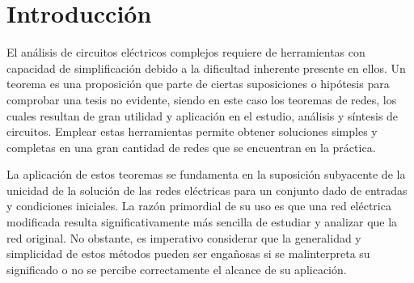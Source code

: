 
\section{Introducción}
El análisis de circuitos eléctricos complejos requiere de herramientas con capacidad de simplificación debido a la dificultad inherente presente en ellos. Un teorema es una proposición que parte de ciertas suposiciones o hipótesis para comprobar una tesis no evidente, siendo en este caso los teoremas de redes, los cuales resultan de gran utilidad y aplicación en el estudio, análisis y síntesis de circuitos. Emplear estas herramientas permite obtener soluciones simples y completas en una gran cantidad de redes que se encuentran en la práctica.

La aplicación de estos teoremas se fundamenta en la suposición subyacente de la unicidad de la solución de las redes eléctricas para un conjunto dado de entradas y condiciones iniciales. La razón primordial de su uso es que una red eléctrica modificada resulta significativamente más sencilla de estudiar y analizar que la red original. No obstante, es imperativo considerar que la generalidad y simplicidad de estos métodos pueden ser engañosas si se malinterpreta su significado o no se percibe correctamente el alcance de su aplicación.